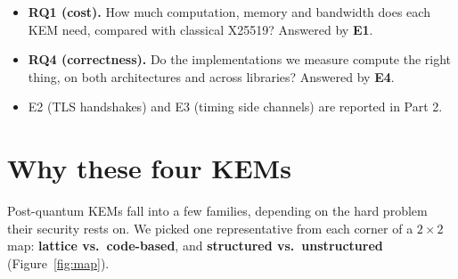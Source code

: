 \documentclass[10.5pt,a4paper]{article}
\newcommand{\sect}[1]{\section{#1}}
\newcommand{\key}[1]{\textbf{#1}}
\begin{document}
\tableofcontents
\vspace{0.6cm}

\begin{takeaway}
\begin{itemize}
\item \key{RQ1 (cost).} How much computation, memory and bandwidth does each KEM need, compared with classical X25519? Answered by \key{E1}.
\item \key{RQ4 (correctness).} Do the implementations we measure compute the right thing, on both architectures and across libraries? Answered by \key{E4}.
\item E2 (TLS handshakes) and E3 (timing side channels) are reported in Part 2.
\end{itemize}
\end{takeaway}

\newpage
\sect{Why these four KEMs}

Post-quantum KEMs fall into a few families, depending on the hard problem their security rests on. We picked one representative from each corner of a $2\times2$ map: \key{lattice vs.\ code-based}, and \key{structured vs.\ unstructured} (Figure~\ref{fig:map}).
\end{document}
